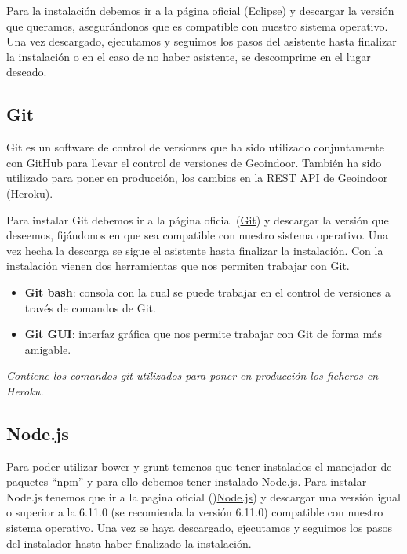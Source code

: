  Para la instalación debemos ir a la página oficial (\href{https://www.eclipse.org/downloads/}{Eclipse}) y descargar la versión que queramos, asegurándonos que es compatible con nuestro sistema operativo. Una vez descargado, ejecutamos y seguimos los pasos del asistente hasta finalizar la instalación o en el caso de no haber asistente, se descomprime en el lugar deseado.
 
 
\subsection{Git} 

Git es un software de control de versiones que ha sido utilizado conjuntamente con GitHub para llevar el control de versiones de Geoindoor. También ha sido utilizado para poner en producción, los cambios en la REST API de Geoindoor (Heroku).

Para instalar Git debemos ir a la página oficial (\href{https://git-scm.com/downloads}{Git}) y descargar la versión que deseemos, fijándonos en que sea compatible con nuestro sistema operativo. Una vez hecha la descarga se sigue el asistente hasta finalizar la instalación. Con la instalación vienen dos herramientas que nos permiten trabajar con Git.

\begin{itemize}
	\item \textbf{Git bash}: consola con la cual se puede trabajar en el control de versiones a través de comandos de Git.
	\item \textbf{Git GUI}: interfaz gráfica que nos permite trabajar con Git de forma más amigable. 
\end{itemize}



\textit{Contiene los comandos git utilizados para poner en producción los ficheros en Heroku.}

\subsection{Node.js}

Para poder utilizar bower y grunt temenos que tener instalados el manejador de paquetes ``npm'' y para ello debemos tener instalado Node.js. Para instalar Node.js tenemos que ir a la pagina oficial ()\href{https://nodejs.org/es/download/}{Node.js}) y descargar una versión igual o superior a la 6.11.0 (se recomienda la versión 6.11.0) compatible con nuestro sistema operativo. Una vez se haya descargado, ejecutamos y seguimos los pasos del instalador hasta haber finalizado la instalación.


